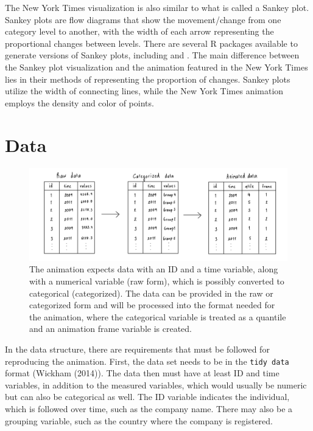 The New York Times visualization is also similar to what is called a Sankey plot. Sankey plots are flow diagrams that show the movement/change from one category level to another, with the width of each arrow representing the proportional changes between levels. There are several R packages available to generate versions of Sankey plots, including  and . The main difference between the Sankey plot visualization and the animation featured in the New York Times lies in their methods of representing the proportion of changes. Sankey plots utilize the width of connecting lines, while the New York Times animation employs the density and color of points.

\hypertarget{data}{%
\section{Data}\label{data}}

\begin{figure}

{\centering \includegraphics[width=1\linewidth]{figures/data-diagram} 

}

\caption{The animation expects data with an ID and a time variable, along with a numerical variable (raw form), which is possibly converted to categorical (categorized). The data can be provided in the raw or categorized form and will be processed into the format needed for the animation, where the categorical variable is treated as a quantile and an animation frame variable is created.}\label{fig:data-diagram}
\end{figure}

In the data structure, there are requirements that must be followed for reproducing the animation. First, the data set needs to be in the \texttt{tidy\ data} format (Wickham (2014)). The data then must have at least ID and time variables, in addition to the measured variables, which would usually be numeric but can also be categorical as well. The ID variable indicates the individual, which is followed over time, such as the company name. There may also be a grouping variable, such as the country where the company is registered.

